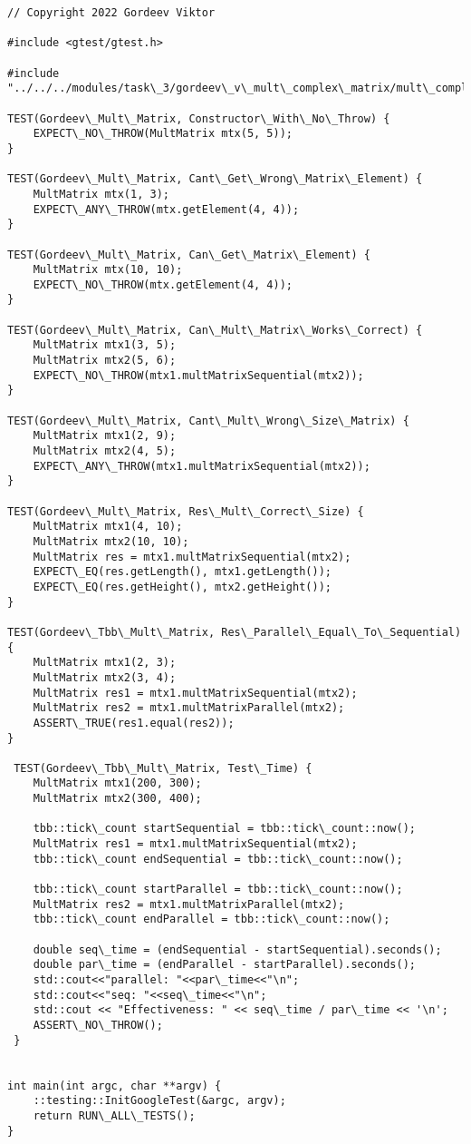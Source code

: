 \documentclass{report}
\begin{document}
\begin{lstlisting}
// Copyright 2022 Gordeev Viktor

#include <gtest/gtest.h>

#include "../../../modules/task\_3/gordeev\_v\_mult\_complex\_matrix/mult\_complex\_matrix.h"

TEST(Gordeev\_Mult\_Matrix, Constructor\_With\_No\_Throw) {
    EXPECT\_NO\_THROW(MultMatrix mtx(5, 5));
}

TEST(Gordeev\_Mult\_Matrix, Cant\_Get\_Wrong\_Matrix\_Element) {
    MultMatrix mtx(1, 3);
    EXPECT\_ANY\_THROW(mtx.getElement(4, 4));
}

TEST(Gordeev\_Mult\_Matrix, Can\_Get\_Matrix\_Element) {
    MultMatrix mtx(10, 10);
    EXPECT\_NO\_THROW(mtx.getElement(4, 4));
}

TEST(Gordeev\_Mult\_Matrix, Can\_Mult\_Matrix\_Works\_Correct) {
    MultMatrix mtx1(3, 5);
    MultMatrix mtx2(5, 6);
    EXPECT\_NO\_THROW(mtx1.multMatrixSequential(mtx2));
}

TEST(Gordeev\_Mult\_Matrix, Cant\_Mult\_Wrong\_Size\_Matrix) {
    MultMatrix mtx1(2, 9);
    MultMatrix mtx2(4, 5);
    EXPECT\_ANY\_THROW(mtx1.multMatrixSequential(mtx2));
}

TEST(Gordeev\_Mult\_Matrix, Res\_Mult\_Correct\_Size) {
    MultMatrix mtx1(4, 10);
    MultMatrix mtx2(10, 10);
    MultMatrix res = mtx1.multMatrixSequential(mtx2);
    EXPECT\_EQ(res.getLength(), mtx1.getLength());
    EXPECT\_EQ(res.getHeight(), mtx2.getHeight());
}

TEST(Gordeev\_Tbb\_Mult\_Matrix, Res\_Parallel\_Equal\_To\_Sequential) {
    MultMatrix mtx1(2, 3);
    MultMatrix mtx2(3, 4);
    MultMatrix res1 = mtx1.multMatrixSequential(mtx2);
    MultMatrix res2 = mtx1.multMatrixParallel(mtx2);
    ASSERT\_TRUE(res1.equal(res2));
}

 TEST(Gordeev\_Tbb\_Mult\_Matrix, Test\_Time) {
    MultMatrix mtx1(200, 300);
    MultMatrix mtx2(300, 400);

    tbb::tick\_count startSequential = tbb::tick\_count::now();
    MultMatrix res1 = mtx1.multMatrixSequential(mtx2);
    tbb::tick\_count endSequential = tbb::tick\_count::now();

    tbb::tick\_count startParallel = tbb::tick\_count::now();
    MultMatrix res2 = mtx1.multMatrixParallel(mtx2);
    tbb::tick\_count endParallel = tbb::tick\_count::now();

    double seq\_time = (endSequential - startSequential).seconds();
    double par\_time = (endParallel - startParallel).seconds();
    std::cout<<"parallel: "<<par\_time<<"\n";
    std::cout<<"seq: "<<seq\_time<<"\n";
    std::cout << "Effectiveness: " << seq\_time / par\_time << '\n';
    ASSERT\_NO\_THROW();
 }


int main(int argc, char **argv) {
    ::testing::InitGoogleTest(&argc, argv);
    return RUN\_ALL\_TESTS();
}

\end{lstlisting}
\end{document}
